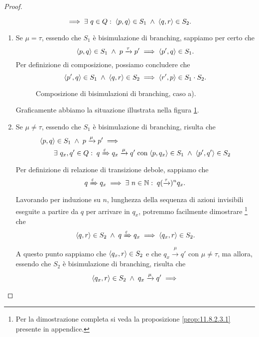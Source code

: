 \begin{proof}
\begin{enumerate}[leftmargin=*]
\[ 	\implies \exists\ q \in Q :\; \langle p,q \rangle \in S_1 \; \land \; \langle q, r \rangle \in S_2.
\]
\begin{enumerate}
\item Se $\mu = \tau$, essendo che $S_1$ è bisimulazione di branching, sappiamo per certo che \[
	\langle p,q \rangle \in S_1 \; \land \; p \xrightarrow{\tau} p'
	\implies \langle p',q \rangle \in S_1.
\]
Per definizione di composizione, possiamo concludere che \[
	\langle p',q \rangle \in S_1 \; \land \; \langle q, r \rangle \in S_2 
	\implies \langle r', p \rangle \in S_1 \cdot S_2.
\]
\begin{figure}
\centering
{}
\caption{Composizione di bisimulazioni di branching, caso a).} \label{fig:11.8.2.3.1}
\end{figure}
Graficamente abbiamo la situazione illustrata nella figura \ref{fig:11.8.2.3.1}.
\item Se $\mu \neq \tau$, essendo che $S_1$ è bisimulazione di branching, risulta che
\begin{align*}
	&\langle p,q \rangle \in S_1 \; \land \; p \xrightarrow{\mu} p' \implies \\
	&\hspace{2em} \exists\ q_x, q' \in Q :\; q \xRightarrow{\varepsilon} q_x \xrightarrow{\mu} q' 
	\; \text{con} \; \langle p, q_x \rangle \in S_1 \; \land \; \langle p', q' \rangle \in S_2
\end{align*}
Per definizione di relazione di transizione debole, sappiamo che \[
	q \xRightarrow{\varepsilon} q_x
	\implies \exists\ n \in \mathbb{N} :\; q (\xrightarrow{\tau})^n q_x.
\]
Lavorando per induzione su $n$, lunghezza della sequenza di azioni invisibili eseguite a partire da $q$ per arrivare in $q_x$, potremmo facilmente dimostrare \footnote{Per la dimostrazione completa si veda la proposizione \ref{prop:11.8.2.3.1} presente in appendice.} che \[
	\langle q, r \rangle \in S_2 \; \land \; q \xRightarrow{\varepsilon} q_x 
	\implies \langle q_x, r \rangle \in S_2.
\]
A questo punto sappiamo che $\langle q_x, r \rangle \in S_2$ e che $q_x \xrightarrow{\mu} q'$ con $\mu \neq \tau$, ma allora, essendo che $S_2$ è bisimulazione di branching, risulta che
\begin{align*}
	&\tupla{q_x, r} \in S_2 \myland q_x \xrightarrow{\mu} q'\implies \\  

\end{align*}
\end{enumerate}
\end{enumerate}
\end{proof}
